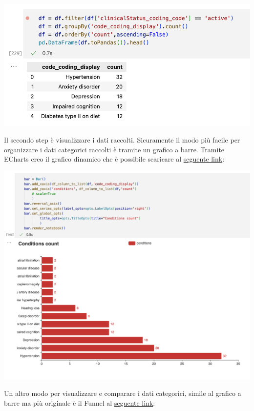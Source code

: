 \documentclass[11pt, oneside]{article}
\begin{document}
\begin{center}
\includegraphics[scale=0.5]{1_conditions.png}
\end{center}

Il secondo step è visualizzare i dati raccolti. Sicuramente il modo più facile per organizzare i dati categorici raccolti è tramite un grafico a barre. Tramite ECharts creo il grafico dinamico che è possibile scaricare al \href{https://github.com/tommasoromano/scientific-vision/blob/main/renderers/bar_conditions.html}{seguente link}:

\begin{center}
\includegraphics[scale=0.5]{1_bars.png}
\end{center}

Un altro modo per visualizzare e comparare i dati categorici, simile al grafico a barre ma più originale è il Funnel al \href{https://github.com/tommasoromano/scientific-vision/blob/main/renderers/funnel_conditions.html}{seguente link}:
\end{document}
